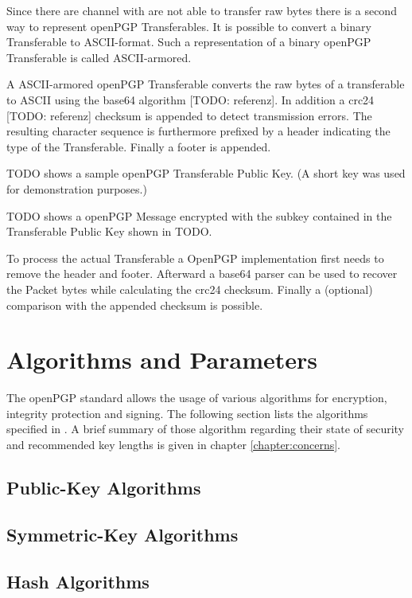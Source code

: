 Since there are channel with are not able to transfer raw bytes there is a second way to represent openPGP Transferables. It is possible to convert a binary Transferable to ASCII-format. Such a representation of a binary openPGP Transferable is called ASCII-armored.

A ASCII-armored openPGP Transferable converts the raw bytes of a transferable to ASCII using the base64 algorithm [TODO: referenz]. In addition a crc24 [TODO: referenz] checksum is appended to detect transmission errors. The resulting character sequence is furthermore prefixed by a header indicating the type of the Transferable. Finally a footer is appended.

TODO shows a sample openPGP Transferable Public Key. (A short key was used for demonstration purposes.)

TODO shows a openPGP Message encrypted with the subkey contained in the Transferable Public Key shown in TODO.


To process the actual Transferable a OpenPGP implementation first needs to remove the header and footer. Afterward a base64 parser can be used to recover the Packet bytes while calculating the crc24 checksum. Finally a (optional) comparison with the appended checksum is possible.



\section{Algorithms and Parameters}



The openPGP standard allows the usage of various algorithms for encryption, integrity protection and signing. The following section lists the algorithms specified in \citep[section 9]{RFC4880}. A brief summary of those algorithm regarding their state of security and recommended key lengths is given in chapter \ref{chapter:concerns}.

\subsection{Public-Key Algorithms}

\subsection{Symmetric-Key Algorithms}

\subsection{Hash Algorithms}

